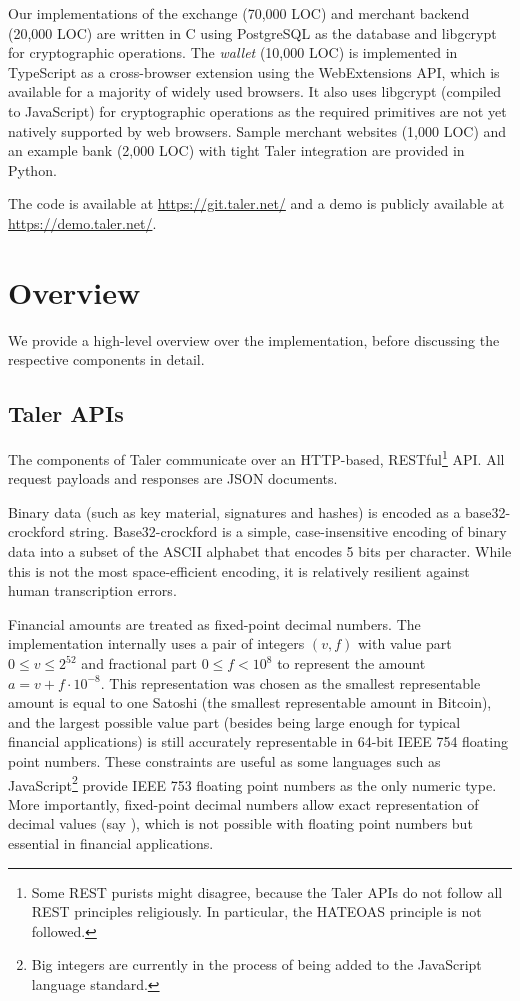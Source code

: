 Our implementations of the exchange (70,000 LOC) and merchant backend
(20,000 LOC) are written in C using PostgreSQL as the database and
libgcrypt for cryptographic operations.  The \emph{wallet} (10,000
LOC) is implemented in TypeScript as a cross-browser extension using
the WebExtensions API, which is available for a majority of widely
used browsers.  It also uses libgcrypt (compiled to JavaScript) for
cryptographic operations as the required primitives are not yet
natively supported by web browsers.  Sample merchant websites (1,000
LOC) and an example bank (2,000 LOC) with tight Taler integration are
provided in Python.

The code is available at \url{https://git.taler.net/} and a demo
is publicly available at \url{https://demo.taler.net/}.

\section{Overview}

We provide a high-level overview over the implementation,
before discussing the respective components in detail.

\subsection{Taler APIs}
The components of Taler communicate over an HTTP-based, RESTful\footnote{
Some REST purists might disagree, because the Taler APIs do not follow
all REST principles religiously.  In particular, the HATEOAS principle is not followed.
} \cite{fielding2000architectural}
API.  All request payloads and responses are JSON \cite{rfc8259} documents.

Binary data (such as key material, signatures and hashes) is encoded as a
base32-crockford \cite{crockford_base32} string. Base32-crockford is a simple,
case-insensitive encoding of binary data into a subset of the ASCII alphabet
that encodes 5 bits per character.  While this is not the most space-efficient
encoding, it is relatively resilient against human transcription errors.

Financial amounts are treated as fixed-point decimal numbers.  The
implementation internally uses a pair of integers $(v,f)$ with value part $0
\le v \le 2^{52}$ and fractional part $0 \le f < 10^8$ to represent the amount
$a = v + f\cdot 10^{-8}$.  This representation was chosen as the smallest
representable amount is equal to one Satoshi (the smallest representable amount
in Bitcoin), and the largest possible value part (besides being large enough
for typical financial applications) is still accurately representable in 64-bit
IEEE 754 floating point numbers.  These constraints are useful as some
languages such as JavaScript\footnote{Big integers are currently in the process
of being added to the JavaScript language standard.} provide IEEE 753 floating
point numbers as the only numeric type.  More importantly, fixed-point decimal
numbers allow exact representation of decimal values (say ), which
is not possible with floating point numbers but essential in financial applications.

